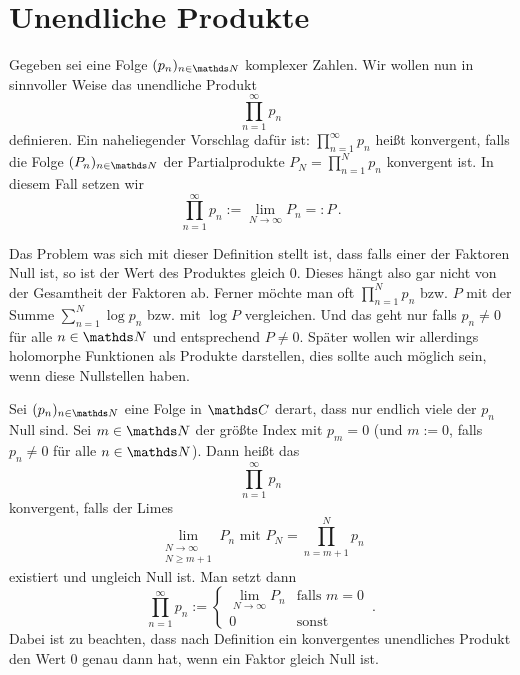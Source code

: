 \section{Unendliche Produkte}

Gegeben sei eine Folge $(p_n)_{n\in\NN}$ komplexer Zahlen.
Wir wollen nun in sinnvoller Weise das unendliche Produkt
\[
	\prod _ {n=1} ^\infty p_n
\]
definieren.
Ein naheliegender Vorschlag dafür ist:
$\prod _ {n=1} ^\infty p_n$ heißt konvergent, falls die Folge $(P_n)_{n\in\NN}$ der Partialprodukte $P_N = \prod _{n=1}^N p_n$ konvergent ist.
In diesem Fall setzen wir
\[
	\prod_{n=1} ^\infty p_n := \lim_{N\to\infty} P_n =: P\,.
\]

Das Problem was sich mit dieser Definition stellt ist, dass falls einer der Faktoren Null ist, so ist der Wert des Produktes gleich $0$.
Dieses hängt also gar nicht von der Gesamtheit der Faktoren ab.
Ferner möchte man oft $\prod _{n=1}^N p_n$ bzw. $P$ mit der Summe $\sum _{n=1}^N \log p_n$ bzw. mit $\log P$ vergleichen.
Und das geht nur falls $p_n\not=0$ für alle $n\in\NN$ und entsprechend $P\not=0$.
Später wollen wir allerdings holomorphe Funktionen als Produkte darstellen, dies sollte auch möglich sein, wenn diese Nullstellen haben.

\begin{defi}
Sei $(p_n)_{n\in\NN}$ eine Folge in $\CC$ derart, dass nur endlich viele der $p_n$ Null sind.
Sei $m\in \NN$ der größte Index mit $p_m = 0$ (und $m:=0$, falls $p_n \not= 0$ für alle $n\in\NN$).
Dann heißt das 
\[
	\prod_{n=1}^\infty p_n
\]
konvergent, falls der Limes
\[
	\lim_{\substack{N\to\infty\\ \scriptscriptstyle N \geq m+1}} P_n \text{ mit } P_N = \prod _ {n=m+1} ^N p_n
\]
existiert und ungleich Null ist.
Man setzt dann
\[
	\prod _ {n=1} ^\infty p_n :=
	\begin{cases}
		\lim\limits_{N\to\infty} P_n &\text{falls } m=0 \\
		0 &\text{sonst}
	\end{cases}
	\,.
\]
Dabei ist zu beachten, dass nach Definition ein konvergentes unendliches Produkt den Wert 0 genau dann hat, wenn ein Faktor gleich Null ist.
\end{defi}

